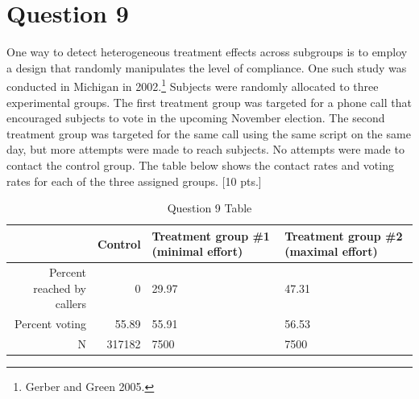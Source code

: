 \documentclass[11pt,notitlepage]{article}\usepackage[]{graphicx}\usepackage[]{color}
\begin{document}
\section*{Question 9}
One way to detect heterogeneous treatment effects across subgroups is to employ a design that randomly manipulates the level of compliance. One such study was conducted in Michigan in 2002.\footnote{Gerber and Green 2005.} Subjects were randomly allocated to three experimental groups. The first treatment group was targeted for a phone call that encouraged subjects to vote in the upcoming November election. The second treatment group was targeted for the same call using the same script on the same day, but more attempts were made to reach subjects. No attempts were made to contact the control group. The table below shows the contact rates and voting rates for each of the three assigned groups. [10 pts.]

\begin{table}[H]
  \centering
  \caption{Question 9 Table}
    \begin{tabular}{rrR{3.5cm}R{3.5cm}}
    \toprule
          & Control  & Treatment group \#1 (minimal effort)  & Treatment group \#2 (maximal effort)  \\
    \midrule
    Percent reached by callers  & 0     & 29.97 & 47.31 \\
    Percent voting  & 55.89 & 55.91 & 56.53 \\
    N     & 317182 & 7500  & 7500 \\
    \bottomrule
    \end{tabular}%
  \label{tab:addlabel}%
\end{table}%
\end{document}
